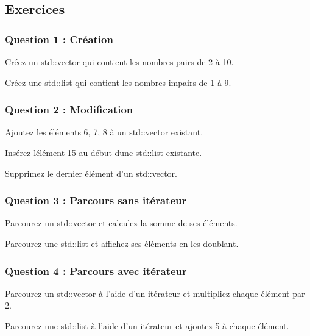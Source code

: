 \subsection*{Exercices}

\subsubsection*{Question 1 \+: Création}


\begin{DoxyEnumerate}
\item Créez un std\+::vector qui contient les nombres pairs de 2 à 10.
\item Créez une std\+::list qui contient les nombres impairs de 1 à 9.
\end{DoxyEnumerate}

\subsubsection*{Question 2 \+: Modification}


\begin{DoxyEnumerate}
\item Ajoutez les éléments 6, 7, 8 à un std\+::vector existant.
\item Insérez l\textquotesingle{}élément 15 au début d\textquotesingle{}une std\+::list existante.
\item Supprimez le dernier élément d’un std\+::vector.
\end{DoxyEnumerate}

\subsubsection*{Question 3 \+: Parcours sans itérateur}


\begin{DoxyEnumerate}
\item Parcourez un std\+::vector et calculez la somme de ses éléments.
\item Parcourez une std\+::list et affichez ses éléments en les doublant.
\end{DoxyEnumerate}

\subsubsection*{Question 4 \+: Parcours avec itérateur}


\begin{DoxyEnumerate}
\item Parcourez un std\+::vector à l’aide d’un itérateur et multipliez chaque élément par 2.
\item Parcourez une std\+::list à l’aide d’un itérateur et ajoutez 5 à chaque élément. 
\end{DoxyEnumerate}